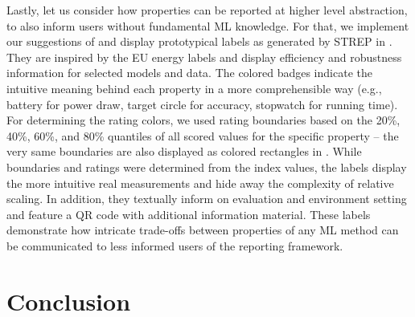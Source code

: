 \documentclass[sn-mathphys,Numbered]{sn-jnl}%
\theoremstyle{thmstylethree}%
\begin{document}
Lastly, let us consider how properties can be reported at higher level abstraction, to also inform users without fundamental ML knowledge.
For that, we implement our suggestions of  and display prototypical labels as generated by STREP in .
They are inspired by the EU energy labels \cite{eu-washingmachines} and display efficiency and robustness information for selected models and data.
The colored badges indicate the intuitive meaning behind each property in a more comprehensible way (e.g., battery for power draw, target circle for accuracy, stopwatch for running time).
For determining the rating colors, we used rating boundaries based on the 20\%, 40\%, 60\%, and 80\% quantiles of all scored values for the specific property -- the very same boundaries are also displayed as colored rectangles in .
While boundaries and ratings were determined from the index values, the labels display the more intuitive real measurements and hide away the complexity of relative scaling.
In addition, they textually inform on evaluation and environment setting and feature a QR code with additional information material.
These labels demonstrate how intricate trade-offs between properties of any ML method can be communicated to less informed users of the reporting framework.





\section{Conclusion}
\end{document}
